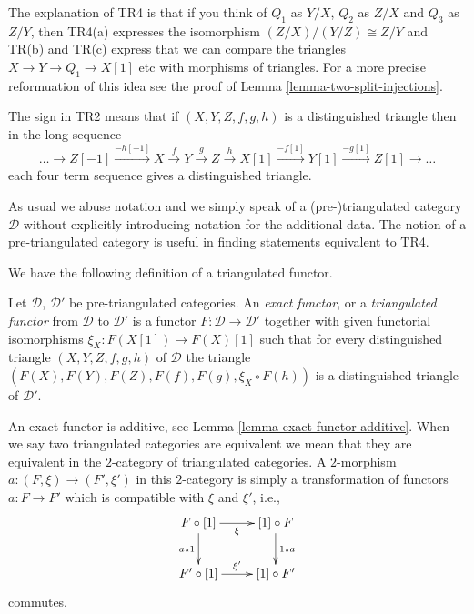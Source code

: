 \noindent
The explanation of TR4 is that if you think of $Q_1$ as
$Y/X$, $Q_2$ as $Z/X$ and $Q_3$ as $Z/Y$, then TR4(a) expresses
the isomorphism $(Z/X)/(Y/Z) \cong Z/Y$ and TR(b) and TR(c)
express that we can compare the triangles $X \to Y \to Q_1 \to X[1]$
etc with morphisms of triangles. For a more precise reformuation
of this idea see the proof of Lemma \ref{lemma-two-split-injections}.

\medskip\noindent
The sign in TR2 means that if $(X, Y, Z, f, g, h)$ is a distinguished triangle
then in the long sequence
\begin{equation}
\label{equation-rotate}
\ldots \to
Z[-1] \xrightarrow{-h[-1]}
X \xrightarrow{f}
Y \xrightarrow{g}
Z \xrightarrow{h}
X[1] \xrightarrow{-f[1]}
Y[1] \xrightarrow{-g[1]}
Z[1] \to \ldots
\end{equation}
each four term sequence gives a distinguished triangle.

\medskip\noindent
As usual we abuse notation and we simply speak of a (pre-)triangulated
category $\mathcal{D}$ without explicitly introducing notation for the
additional data. The notion of a pre-triangulated category is
useful in finding statements equivalent to TR4.

\medskip\noindent
We have the following definition of a triangulated functor.

\begin{definition}
\label{definition-exact-functor-triangulated-categories}
Let $\mathcal{D}$, $\mathcal{D}'$ be pre-triangulated
categories. An {\it exact functor}, or a {\it triangulated functor}
from $\mathcal{D}$ to $\mathcal{D}'$ is a functor
$F : \mathcal{D} \to \mathcal{D}'$ together
with given functorial isomorphisms $\xi_X : F(X[1]) \to F(X)[1]$
such that for every distinguished triangle
$(X, Y, Z, f, g, h)$ of $\mathcal{D}$ the triangle
$(F(X), F(Y), F(Z), F(f), F(g), \xi_X \circ F(h))$
is a distinguished triangle of $\mathcal{D}'$.
\end{definition}

\noindent
An exact functor is additive, see
Lemma \ref{lemma-exact-functor-additive}.
When we say two triangulated categories are equivalent we mean that
they are equivalent in the $2$-category of triangulated categories.
A $2$-morphism $a : (F, \xi) \to (F', \xi')$ in this $2$-category is
simply a transformation of functors $a : F \to F'$ which is compatible
with $\xi$ and $\xi'$, i.e.,
$$
\xymatrix{
F \circ [1] \ar[r]_\xi \ar[d]_{a \star 1} & [1] \circ F \ar[d]^{1 \star a} \\
F' \circ [1] \ar[r]^{\xi'} & [1] \circ F'
}
$$
commutes.

